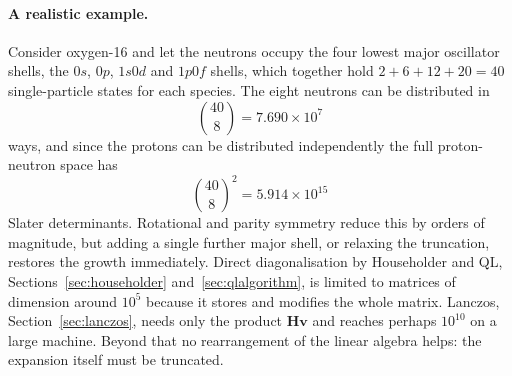 \paragraph{A realistic example.}
Consider oxygen-16 and let the neutrons occupy the four lowest major
oscillator shells, the $0s$, $0p$, $1s0d$ and $1p0f$ shells, which together
hold $2+6+12+20=40$ single-particle states for each species.  The eight
neutrons can be distributed in
\begin{equation}
  \binom{40}{8} = 7.690\times10^{7}
  \label{eq:5-oxygen}
\end{equation}
ways, and since the protons can be distributed independently the full
proton-neutron space has
\begin{equation}
  \binom{40}{8}^2 = 5.914\times10^{15}
  \label{eq:5-oxygen2}
\end{equation}
Slater determinants.  Rotational and parity symmetry reduce this by orders of
magnitude, but adding a single further major shell, or relaxing the
truncation, restores the growth immediately.  Direct diagonalisation by
Householder and QL, Sections~\ref{sec:householder}
and~\ref{sec:qlalgorithm}, is limited to matrices of dimension around $10^5$
because it stores and modifies the whole matrix.  Lanczos,
Section~\ref{sec:lanczos}, needs only the product $\bm{H}\bm{v}$ and reaches
perhaps $10^{10}$ on a large machine.  Beyond that no rearrangement of the
linear algebra helps: the expansion itself must be truncated.

